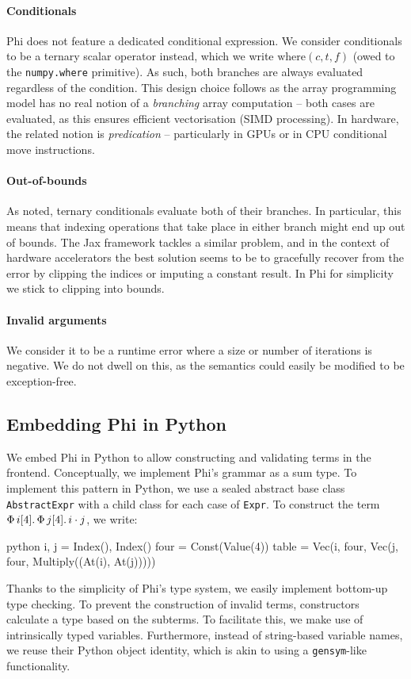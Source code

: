 \paragraph{Conditionals} Phi does not feature a dedicated conditional expression. We consider conditionals to be a ternary scalar operator instead, which we write $\mathrm{where}(c, t, f)$ (owed to the \texttt{numpy.where} primitive). As such, both branches are always evaluated regardless of the condition. This design choice follows as the array programming model has no real notion of a \textit{branching} array computation -- both cases are evaluated, as this ensures efficient vectorisation (SIMD processing). In hardware, the related notion is \textit{predication} -- particularly in GPUs or in CPU conditional move instructions.

\paragraph{Out-of-bounds} As noted, ternary conditionals evaluate both of their branches. In particular, this means that indexing operations that take place in either branch might end up out of bounds. 
The Jax framework tackles a similar problem, and in the context of hardware accelerators the best solution seems to be to gracefully recover from the error by clipping the indices or imputing a constant result. 
In Phi for simplicity we stick to clipping into bounds.

\paragraph{Invalid arguments} We consider it to be a runtime error where a size or number of iterations is negative. We do not dwell on this, as the semantics could easily be modified to be exception-free.

\subsection{Embedding Phi in Python}
\label{embedding-phi}

We embed Phi in Python to allow constructing and validating terms in the frontend. Conceptually, we implement Phi's grammar as a sum type. To implement this pattern in Python, we use a sealed abstract base class \texttt{AbstractExpr} with a child class for each case of \texttt{Expr}. To construct the term $\Phi\, {i}[{4}] \ldotp {\Phi\, {j}[{4}] \ldotp {i \cdot j}}$, we write:
\begin{center}
\begin{cminted}{python}
i, j = Index(), Index()
four = Const(Value(4))
table = Vec(i, four, Vec(j, four, Multiply((At(i), At(j)))))
\end{cminted}
\end{center}
Thanks to the simplicity of Phi's type system, we easily implement bottom-up type checking. To prevent the construction of invalid terms, constructors calculate a type based on the subterms. To facilitate this, we make use of intrinsically typed variables. 
Furthermore, instead of string-based variable names, we reuse their Python object identity, which is akin to using a \texttt{gensym}-like functionality.


